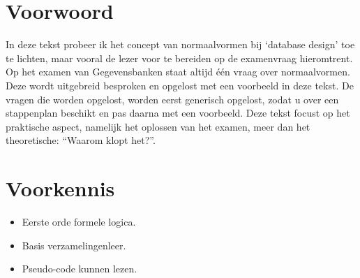 \documentclass[normaalvormen.tex]{subfiles}
\begin{document}
\section*{Voorwoord}
In deze tekst probeer ik het concept van normaalvormen bij `database design' toe te lichten, maar vooral de lezer voor te bereiden op de examenvraag hieromtrent.
Op het examen van Gegevensbanken staat altijd \'e\'en vraag over normaalvormen. Deze wordt uitgebreid besproken en opgelost met een voorbeeld in deze tekst.
De vragen die worden opgelost, worden eerst generisch opgelost, zodat u over een stappenplan beschikt en pas daarna met een voorbeeld.
Deze tekst focust op het praktische aspect, namelijk het oplossen van het examen, meer dan het theoretische: ``Waarom klopt het?''.

\section*{Voorkennis}
\begin{itemize}
\item Eerste orde formele logica.
\item Basis verzamelingenleer.
\item Pseudo-code kunnen lezen.
\end{itemize}
\end{document}
